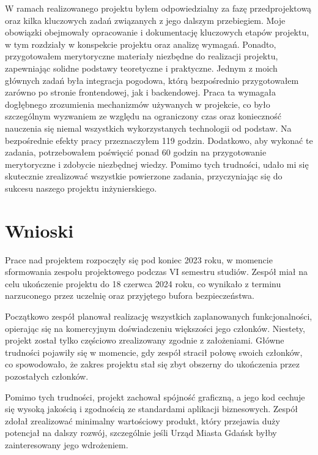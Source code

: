 W ramach realizowanego projektu byłem odpowiedzialny za fazę przedprojektową oraz kilka kluczowych zadań związanych z jego dalszym przebiegiem.\newline
Moje obowiązki obejmowały opracowanie i dokumentację kluczowych etapów projektu, w tym rozdziały w konspekcie projektu oraz analizę wymagań. \newline
Ponadto, przygotowałem merytoryczne materiały niezbędne do realizacji projektu, zapewniając solidne podstawy teoretyczne i praktyczne. \newline
Jednym z moich głównych zadań była integracja pogodowa, którą bezpośrednio przygotowałem zarówno po stronie frontendowej, jak i backendowej.\newline
\indent Praca ta wymagała dogłębnego zrozumienia mechanizmów używanych w projekcie, co było szczególnym wyzwaniem ze względu na ograniczony czas oraz konieczność nauczenia się niemal wszystkich wykorzystanych technologii od podstaw.
Na bezpośrednie efekty pracy przeznaczyłem 119 godzin. Dodatkowo, aby wykonać te zadania, potrzebowałem poświęcić ponad 60 godzin na przygotowanie merytoryczne i zdobycie niezbędnej wiedzy.\newline
Pomimo tych trudności, udało mi się skutecznie zrealizować wszystkie powierzone zadania, przyczyniając się do sukcesu naszego projektu inżynierskiego.

\section{Wnioski}\label{sec:wnioski}
Prace nad projektem rozpoczęły się pod koniec 2023 roku, w momencie sformowania zespołu projektowego podczas VI semestru studiów.
Zespół miał na celu ukończenie projektu do 18 czerwca 2024 roku, co wynikało z terminu narzuconego przez uczelnię oraz przyjętego bufora bezpieczeństwa.

Początkowo zespół planował realizację wszystkich zaplanowanych funkcjonalności, opierając się na komercyjnym doświadczeniu większości jego członków.
Niestety, projekt został tylko częściowo zrealizowany zgodnie z założeniami.
Główne trudności pojawiły się w momencie, gdy zespół stracił połowę swoich członków, co spowodowało, że zakres projektu stał się zbyt obszerny do ukończenia przez pozostałych członków.

Pomimo tych trudności, projekt zachował spójność graficzną, a jego kod cechuje się wysoką jakością i zgodnością ze standardami aplikacji biznesowych.
Zespół zdołał zrealizować minimalny wartościowy produkt, który przejawia duży potencjał na dalszy rozwój, szczególnie jeśli Urząd Miasta Gdańsk byłby zainteresowany jego wdrożeniem.

